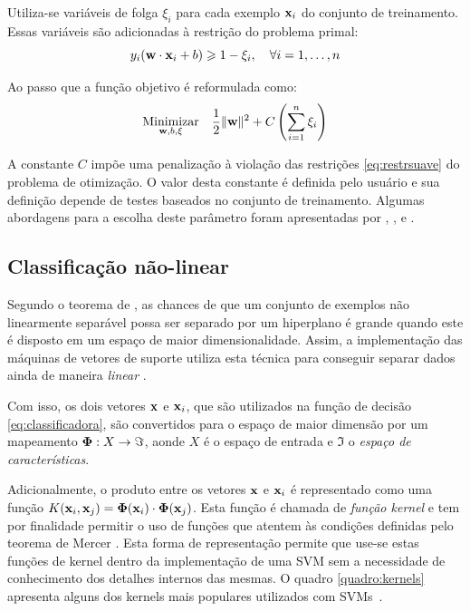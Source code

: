 Utiliza-se variáveis de folga $\xi_i$ para cada exemplo $\mathbf{x}_i$ do conjunto de treinamento. Essas variáveis são adicionadas à restrição do problema primal:
\begin{equation}\label{eq:restrsuave}
  y_i(\mathbf{w}\cdot\mathbf{x}_i+b) \geqslant 1 - \xi_i,\quad\forall{i}=1,\dotsc,n
\end{equation}

Ao passo que a função objetivo é reformulada como:
\begin{equation}
  \underset{\mathbf{w}, b, \mathbf{\xi}}{\operatorname{Minimizar}}\quad
         \frac{1}{2}\lVert \mathbf{w} \rVert^2+C\left(\sum_{i=1}^n{\xi_i}\right)
\end{equation}

A constante $C$ impõe uma penalização à violação das restrições \ref{eq:restrsuave} do problema de otimização. O valor desta constante é definida pelo usuário e sua definição depende de testes baseados no conjunto de treinamento. Algumas abordagens para a escolha deste parâmetro foram apresentadas por , ,  e \cite{ben2010user}.


\subsection{Classificação não-linear}\label{sec:naolinear}

Segundo o teorema de , as chances de que um conjunto de exemplos não linearmente separável possa ser separado por um hiperplano é grande quando este é disposto em um espaço de maior dimensionalidade. Assim, a implementação das máquinas de vetores de suporte utiliza esta técnica para conseguir separar dados ainda de maneira \emph{linear} \cite{burges1998tutorial}.

Com isso, os dois vetores $\mathbf{x}$ e $\mathbf{x}_i$, que são utilizados na função de decisão \ref{eq:classificadora}, são convertidos para o espaço de maior dimensão por um mapeamento $\mathbf{\Phi}: X \rightarrow \Im$, aonde $X$ é o espaço de entrada e $\Im$ o \emph{espaço de características}.

Adicionalmente, o produto entre os vetores $\mathbf{x}$ e $\mathbf{x}_i$ é representado como uma função $K(\mathbf{x}_i, \mathbf{x}_j) = \mathbf{\Phi}(\mathbf{x}_i)\cdot\mathbf{\Phi}(\mathbf{x}_j)$. Esta função é chamada de \emph{função kernel} e tem por finalidade permitir o uso de funções que atentem às condições definidas pelo teorema de Mercer \cite[p. 141]{burges1998tutorial}. Esta forma de representação permite que use-se estas funções de kernel dentro da implementação de uma SVM sem a necessidade de conhecimento dos detalhes internos das mesmas. O quadro \ref{quadro:kernels} apresenta alguns dos kernels mais populares utilizados com SVMs~\cite{lorena2003introducaoas}.

